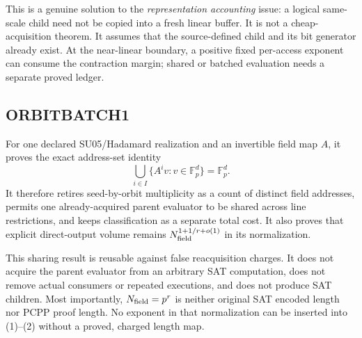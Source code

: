 \documentclass[11pt]{article}
\begin{document}
This is a genuine solution to the \emph{representation accounting} issue:
a logical same-scale child need not be copied into a fresh linear buffer.
It is not a cheap-acquisition theorem.  It assumes that the source-defined
child and its bit generator already exist.  At the near-linear boundary, a
positive fixed per-access exponent can consume the contraction margin;
shared or batched evaluation needs a separate proved ledger.

\subsection*{ORBITBATCH1}
For one declared SU05/Hadamard realization and an invertible field map $A$,
it proves the exact address-set identity
\[
 \bigcup_{i\in I}\{A^iv:v\in\mathbb F_p^d\}=\mathbb F_p^d.
 \tag{7}
\]
It therefore retires seed-by-orbit multiplicity as a count of distinct field
addresses, permits one already-acquired parent evaluator to be shared across
line restrictions, and keeps classification as a separate total cost.  It
also proves that explicit direct-output volume remains
$N_{\rm field}^{1+1/r+o(1)}$ in its normalization.

This sharing result is reusable against false reacquisition charges.  It does
not acquire the parent evaluator from an arbitrary SAT computation, does not
remove actual consumers or repeated executions, and does not produce SAT
children.  Most importantly, $N_{\rm field}=p^r$ is neither original SAT
encoded length nor PCPP proof length.  No exponent in that normalization can
be inserted into (1)--(2) without a proved, charged length map.
\end{document}
